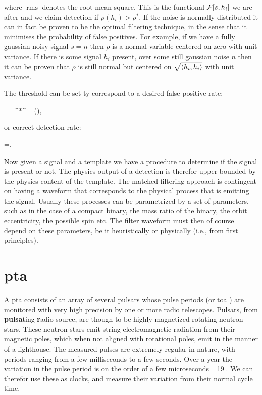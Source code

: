 \documentclass[
  10pt,
  a4paper,
  DIV=11,
  numbers=noendperiod,
  twoside]{scrreprt}
\let\[\relax \let\]\relax %
\DeclareRobustCommand{\[}{\begin{equation}}
\DeclareRobustCommand{\]}{\end{equation}}
\begin{document}
where \(\operatorname{rms}\) denotes the root mean square. This is the
functional \(\mathcal{F}[s,h_i ]\) we are after and we claim
detection if \(\rho(h_i)>\rho^*\). If the noise is normally distributed
it can in fact be proven to be the optimal filtering technique, in the
sense that it minimises the probability of false positives. For example,
if we have a fully gaussian noisy signal \(s=n\) then \(\rho\) is a
normal variable centered on zero with unit variance. If there is some
signal \(h_i\) present, over some still gaussian noise \(n\) then it can
be proven that \(\rho\) is still normal but centered on
\(\sqrt{\langle h_i,h_i \rangle}\) with unit variance.

The threshold can be set ty correspond to a desired false positive
rate:

\[=\sqrt{\inv{2\pi}}\int\limits_{\rho^*}^{\infty} \dd{\rho}=\half {}(),\]

or correct detection rate:

\[
=\Half{}.  
\]

Now given a signal and a template we have a procedure to determine if
the signal is present or not. The physics output of a detection is
therefor upper bounded by the physics content of the template. The
matched filtering approach is contingent on having a waveform that
corresponds to the physical process that is emitting the signal. Usually
these processes can be parametrized by a set of parameters, such as in
the case of a compact binary, the mass ratio of the binary, the orbit
eccentricity, the possible spin etc. The filter waveform must then of
course depend on these parameters, be it heuristically or physically
(i.e., from first principles).

\hypertarget{pta}{%
\section{\texorpdfstring{\gls{pta}}{}}\label{pta}}

A \gls{pta} consists of an array of several pulsars whose pulse periods
(or \gls{toa} ) are monitored with very high precision by one or more
radio telescopes. Pulsars, from \textbf{pulsa}ting \textbf{r}adio
source, are though to be highly magnetized rotating neutron stars. These
neutron stars emit string electromagnetic radiation from their magnetic
poles, which when not aligned with rotational poles, emit in the manner
of a lighthouse. The measured pulses are extremely regular in nature,
with periods ranging from a few milliseconds to a few seconds. Over a
year the variation in the pulse period is on the order of a few
microseconds ~{[}\protect\hyperlink{ref-Detweiler:1979wn}{19}{]}. We can
therefor use these as clocks, and measure their variation from their
normal cycle time.
\end{document}
